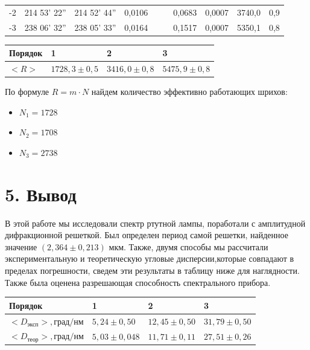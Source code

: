 \documentclass[a4paper,12pt]{report}
\begin{document}
\begin{table}[H]
\begin{tabular}{|c|cc|c|c|c|c|c|c|c|}
-2                       & \multicolumn{1}{c|}{214 53' 22''} & 214 52' 44'' & 0,0106                &                                  &                                         & 0,0683             & 0,0007                   & 3740,0             & 0,9                      \\ \cline{1-4} \cline{7-10} 
-3                       & \multicolumn{1}{c|}{238 06' 32''} & 238 05' 33'' & 0,0164                &                                  &                                         & 0,1517             & 0,0007                   & 5350,1             & 0,8                      \\ \hline
\end{tabular}
\end{table}

\begin{table}[H]
\begin{tabular}{|l|l|l|l|}
\hline
Порядок                    & 1     & 2     & 3     \\ \hline
$<R> $ & $1728,3\pm 0,5$ & $3416,0 \pm 0,8$ & $5475,9 \pm 0,8$ \\ \hline
\end{tabular}
\end{table}


По формуле $R = m \cdot N$ найдем количество эффективно работающих шрихов: 
\begin{itemize}
    \item $N_{1} = 1728$
    \item $N_{2} = 1708$
    \item $N_{3} = 2738$
    
\end{itemize}

\section*{5. Вывод}

В этой работе мы исследовали спектр ртутной лампы, поработали с амплитудной дифракционной решеткой. Был определен период самой решетки, найденное значение $(2,364 \pm 0,213)$ мкм. Также, двумя способы мы рассчитали экспериментальную и теоретическую угловые дисперсии,которые совпадают в пределах погрешности, сведем эти результаты в таблицу ниже для наглядности. Также была оценена разрешающая способность спектрального прибора. 

\begin{table}[H]
\begin{tabular}{|l|l|l|l|}
\hline
Порядок & 1 & 2  & 3 \\ \hline
$<D_{\text{эксп}}>, \text{град/нм}$   & $5,24\pm 0,50$ & $12,45 \pm 0,50$ & $31,79 \pm 0,50$ \\ \hline
$<D_{\text{теор}}>, \text{град/нм}$   & $5,03\pm 0,048$ & $11,71 \pm 0,11$ & $27,51 \pm 0,26$ \\ \hline
\end{tabular}
\end{table}
\end{document}
